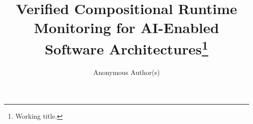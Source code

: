 \documentclass[runningheads,orivec]{llncs}
\begin{document}
\title{Verified Compositional Runtime Monitoring for AI-Enabled Software
Architectures\thanks{Working title.}}

\author{Anonymous Author(s)}

\maketitle

















\end{document}
